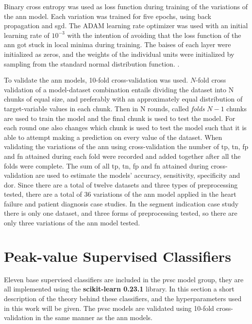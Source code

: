 Binary cross entropy was used as loss function during training of the variations of the \acrshort{ann} model. Each variation was trained for five epochs, using back propagation and \acrshort{sgd}. The ADAM learning rate optimizer was used with an initial learning rate of $10^{-3}$ with the intention of avoiding that the loss function of the \acrshort{ann} got stuck in local minima during training. The baises of each layer were initialized as zeros, and the weights of the individual units were initialized by sampling from the standard normal distribution function. \bigskip. 

To validate the \acrshort{ann} models, 10-fold cross-validation was used. $N$-fold cross validation of a model-dataset combination entails dividing the dataset into N chunks of equal size, and preferably with an approximately equal distribution of target-variable values in each chunk. Then in N rounds, called \textit{folds} $N-1$ chunks are used to train the model and the final chunk is used to test the model. For each round one also changes which chunk is used to test the model such that it is able to attempt making a prediction on every value of the dataset. When validating the variations of the \acrshort{ann} using cross-validation the number of \acrshort{tp}, \acrshort{tn}, \acrshort{fp} and \acrshort{fn} attained during each fold were recorded and added together after all the folds were complete. The sum of all \acrshort{tp}, \acrshort{tn}, \acrshort{fp} and \acrshort{fn} attained during cross-validation are used to estimate the models' accuracy, sensitivity, specificity and \acrshort{dor}. Since there are a total of twelve datasets and three types of preprocessing tested, there are a total of 36 variations of the \acrshort{ann} model applied in the heart failure and patient diagnosis case studies. In the segment indication case study there is only one dataset, and three forms of preprocessing tested, so there are only three variations of the \acrshort{ann} model tested.

\section{Peak-value Supervised Classifiers} \label{sec:meth_pvsc}

Eleven base supervised classifiers are included in the \acrshort{pvsc} model group, they are all implemented using the \textbf{scikit-learn 0.23.1} library. In this section a short description of the theory behind these classifiers, and the hyperparameters used in this work will be given. The \acrshort{pvsc} models are validated using 10-fold cross-validation in the same manner as the \acrshort{ann} models.

